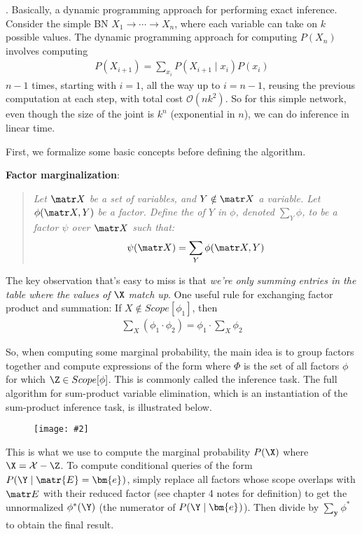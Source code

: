 \documentclass[11pt]{article}
\renewcommand\vec[2][]{\bm{#2}_{#1}}
\newcommand\myfig[2][0.3\textwidth]{\begin{figure}[h!]\centering\texttt{[image: \#2]}\end{figure}}
\newcommand\myspace[1][]{\vspace{#1\bigskipamount}}
\newcommand\p{\Needspace{10\baselineskip} \noindent}
\newcommand\tlab[1]{\tag{#1}\label{#1}}
\begin{document}
\myspace
\p {}. Basically, a dynamic programming approach for performing exact inference. Consider the simple BN $X_1 \rightarrow \cdots \rightarrow X_n$, where each variable can take on $k$ possible values. The dynamic programming approach for computing $P(X_{n})$ involves computing
\begin{align}
	P(X_{i + 1}) = \sum_{x_i} P(X_{i + 1} \mid x_i) P(x_i)
\end{align} 
$n - 1$ times, starting with $i = 1$, all the way up to $i = n - 1$, reusing the previous computation at each step, with total cost $\mathcal{O}(nk^2)$. So for this simple network, even though the size of the joint is $k^n$ (exponential in $n$), we can do inference in linear time. 

First, we formalize some basic concepts before defining the algorithm. 

\p \textbf{Factor marginalization}:
\vspace{-1em}
\begin{quote}
	{\itshape
		Let $\matr X$ be a set of variables, and $Y \notin \matr X$ a variable. Let $\phi(\matr X, Y)$ be a factor. Define the  of $Y$ in $\phi$, denoted $\sum_Y \phi$, to be a factor $\psi$ over $\matr X$ such that:
		$$
		\psi(\matr X) = \sum_Y \phi(\matr X, Y)
		$$	
	}
\end{quote} 
The key observation that's easy to miss is that \textit{we're only summing entries in the table where the values of $\X$ match up}. One useful rule for exchanging factor product and summation: If $X \notin Scope[\phi_1]$, then
\begin{align}
	\sum_X (\phi_1 \cdot \phi_2) = \phi_1 \cdot \sum_X \phi_2 \tlab{9.6}
\end{align}

So, when computing some marginal probability, the main idea is to group factors together and compute expressions of the form
\graybox{
	\sum_{\Z} \prod_{\phi \in \Phi} \phi
} where $\Phi$ is the set of all factors $\phi$ for which $\Z \in Scope[\phi]$. This is commonly called the  inference task. The full algorithm for sum-product variable elimination, which is an instantiation of the sum-product inference task, is illustrated below.

\myfig[0.4\textwidth]{figs/variable_elimination.png}

This is what we use to compute the marginal probability $P(\X)$ where $\X = \mathcal{X} - \Z$. To compute conditional queries of the form $P(\Y \mid \matr{E} = \vec e)$, simply replace all factors whose scope overlaps with $\matr E$ with their reduced factor (see chapter 4 notes for definition) to get the unnormalized $\phi^*(\Y)$ (the numerator of $P(\Y \mid \vec e)$). Then divide by $\sum_{\vec y} \phi^*$ to obtain the final result.
\end{document}
